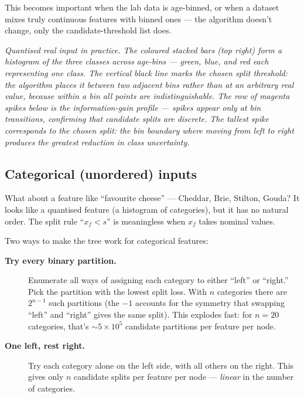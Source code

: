 \documentclass[11pt, a4paper]{article}
\begin{document}
\begin{notebox}
This becomes important when the lab data is age-binned, or when a dataset mixes truly continuous features with binned ones — the algorithm doesn't change, only the candidate-threshold list does.
\end{notebox}

\begin{center}

\footnotesize\textit{Quantised real input in practice. The coloured stacked bars (top right) form a histogram of the three classes across age-bins --- green, blue, and red each representing one class. The vertical black line marks the chosen split threshold: the algorithm places it \emph{between} two adjacent bins rather than at an arbitrary real value, because within a bin all points are indistinguishable. The row of magenta spikes below is the information-gain profile --- spikes appear \emph{only} at bin transitions, confirming that candidate splits are discrete. The tallest spike corresponds to the chosen split: the bin boundary where moving from left to right produces the greatest reduction in class uncertainty.}
\end{center}

\subsection{Categorical (unordered) inputs}

What about a feature like ``favourite cheese'' — Cheddar, Brie, Stilton, Gouda? It looks like a quantised feature (a histogram of categories), but it has no natural order. The split rule ``$x_f < s$'' is meaningless when $x_f$ takes nominal values.

Two ways to make the tree work for categorical features:

\begin{description}
  \item[\textbf{Try every binary partition.}] Enumerate all ways of assigning each category to either ``left'' or ``right.'' Pick the partition with the lowest split loss. With $n$ categories there are $2^{n-1}$ such partitions (the $-1$ accounts for the symmetry that swapping ``left'' and ``right'' gives the same split). This explodes fast: for $n=20$ categories, that's $\sim 5 \times 10^5$ candidate partitions per feature per node.
  \item[\textbf{One left, rest right.}] Try each category alone on the left side, with all others on the right. This gives only $n$ candidate splits per feature per node — \emph{linear} in the number of categories.
\end{description}
\end{document}
